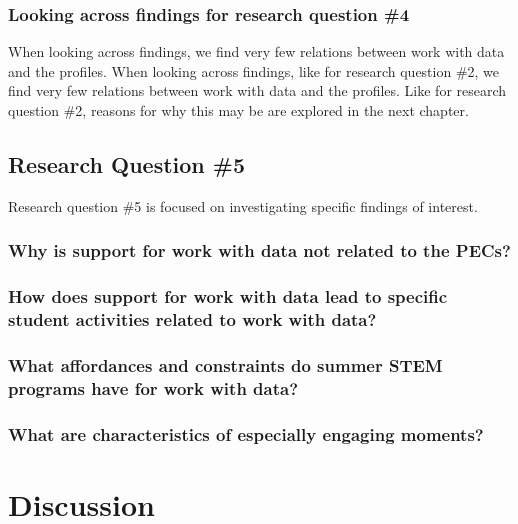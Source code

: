\documentclass[]{book}
\theoremstyle{definition}
\theoremstyle{definition}
\theoremstyle{definition}
\theoremstyle{remark}
\begin{document}
\subsection{Looking across findings for research question
\#4}\label{looking-across-findings-for-research-question-4}

When looking across findings, we find very few relations between work
with data and the profiles. When looking across findings, like for
research question \#2, we find very few relations between work with data
and the profiles. Like for research question \#2, reasons for why this
may be are explored in the next chapter.

\section{Research Question \#5}\label{research-question-5}

Research question \#5 is focused on investigating specific findings of
interest.

\subsection{Why is support for work with data not related to the
PECs?}\label{why-is-support-for-work-with-data-not-related-to-the-pecs}

\subsection{How does support for work with data lead to specific student
activities related to work with
data?}\label{how-does-support-for-work-with-data-lead-to-specific-student-activities-related-to-work-with-data}

\subsection{What affordances and constraints do summer STEM programs
have for work with
data?}\label{what-affordances-and-constraints-do-summer-stem-programs-have-for-work-with-data}

\subsection{What are characteristics of especially engaging
moments?}\label{what-are-characteristics-of-especially-engaging-moments}

\chapter{Discussion}\label{discussion}
\end{document}
